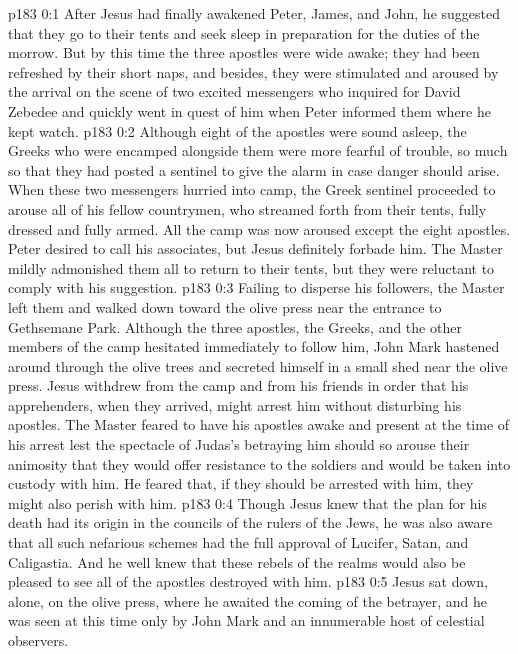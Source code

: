 \author{Midwayer Commission}
\vs p183 0:1 After Jesus had finally awakened Peter, James, and John, he suggested that they go to their tents and seek sleep in preparation for the duties of the morrow. But by this time the three apostles were wide awake; they had been refreshed by their short naps, and besides, they were stimulated and aroused by the arrival on the scene of two excited messengers who inquired for David Zebedee and quickly went in quest of him when Peter informed them where he kept watch.
\vs p183 0:2 Although eight of the apostles were sound asleep, the Greeks who were encamped alongside them were more fearful of trouble, so much so that they had posted a sentinel to give the alarm in case danger should arise. When these two messengers hurried into camp, the Greek sentinel proceeded to arouse all of his fellow countrymen, who streamed forth from their tents, fully dressed and fully armed. All the camp was now aroused except the eight apostles. Peter desired to call his associates, but Jesus definitely forbade him. The Master mildly admonished them all to return to their tents, but they were reluctant to comply with his suggestion.
\vs p183 0:3 Failing to disperse his followers, the Master left them and walked down toward the olive press near the entrance to Gethsemane Park. Although the three apostles, the Greeks, and the other members of the camp hesitated immediately to follow him, John Mark hastened around through the olive trees and secreted himself in a small shed near the olive press. Jesus withdrew from the camp and from his friends in order that his apprehenders, when they arrived, might arrest him without disturbing his apostles. The Master feared to have his apostles awake and present at the time of his arrest lest the spectacle of Judas’s betraying him should so arouse their animosity that they would offer resistance to the soldiers and would be taken into custody with him. He feared that, if they should be arrested with him, they might also perish with him.
\vs p183 0:4 Though Jesus knew that the plan for his death had its origin in the councils of the rulers of the Jews, he was also aware that all such nefarious schemes had the full approval of Lucifer, Satan, and Caligastia. And he well knew that these rebels of the realms would also be pleased to see all of the apostles destroyed with him.
\vs p183 0:5 Jesus sat down, alone, on the olive press, where he awaited the coming of the betrayer, and he was seen at this time only by John Mark and an innumerable host of celestial observers.
